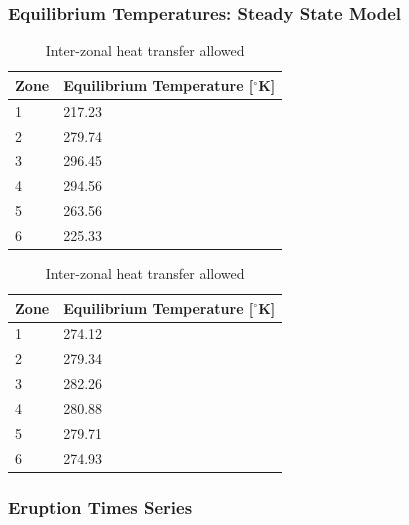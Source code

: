 \documentclass[12pt]{article}
\begin{document}
\subsubsection{Equilibrium Temperatures: Steady State Model}
\begin{table}[H]
    \parbox{.45\linewidth}{
    \captionsetup{singlelinecheck = false, justification=justified}
    \caption{Inter-zonal heat transfer suppressed}
    \begin{tabular}{ll}
    \hline
    Zone & Equilibrium Temperature [$^{\circ}$K] \\
    \hline
    1 & 217.23 \\
    2 & 279.74 \\
    3 & 296.45 \\
    4 & 294.56 \\ 
    5 & 263.56 \\
    6 & 225.33 \\
    \end{tabular}
    \label{tab:supressedteq}
    }
\hfill
    \parbox{.45\linewidth}{
    \captionsetup{singlelinecheck = false, justification=justified}
    \caption{Inter-zonal heat transfer allowed}
    \begin{tabular}{ll}
    \hline
    Zone & Equilibrium Temperature [$^{\circ}$K] \\
    \hline
    1 & 274.12 \\
    2 & 279.34 \\
    3 & 282.26 \\
    4 & 280.88 \\ 
    5 & 279.71 \\
    6 & 274.93 \\
    \end{tabular}
    \label{tab:teq}
    }
\end{table}
\FloatBarrier

\subsubsection{Eruption Times Series}
\begin{table}[H]
    \parbox{.45\linewidth}{
    \captionsetup{singlelinecheck = false, justification=justified}
    \caption{Eruption Times Series 1}
    \label{tab:erupt1}
    }
    \hfill
    \parbox{.45\linewidth}{
    \captionsetup{singlelinecheck = false, justification=justified}
    \caption{Eruption Time Series 2}
    \label{tab:erupt2}
    }
\end{table}
\end{document}
